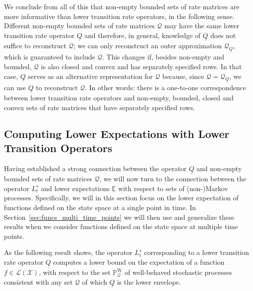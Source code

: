 \documentclass[10pt,a4paper]{paper}
\theoremstyle{definition}
\newcommand{\states}{\mathcal{X}}
\newcommand{\processes}{\mathbb{P}}
\newcommand{\wprocesses}{\processes^{\mathrm{W}}}
\newcommand{\gambles}{\mathcal{L}}
\newcommand{\gamblesX}{\gambles(\states)}
\newcommand{\rateset}{\mathcal{Q}}
\newcommand{\lrate}{\underline{Q}}
\begin{document}
We conclude from all of this that non-empty bounded sets of rate matrices are more informative than lower transition rate operators, in the following sense. Different non-empty bounded sets of rate matrices $\rateset$ may have the same lower transition rate operator $\lrate$ and therefore, in general, knowledge of $\lrate$ does not suffice to reconstruct $\rateset$; we can only reconstruct an outer approximation $\rateset_{\lrate}$, which is guaranteed to include $\rateset$. This changes if, besides non-empty and bounded, $\rateset$ is also closed and convex and has separately specified rows. In that case, $\lrate$ serves as an alternative representation for $\rateset$ because, since $\rateset=\rateset_{\lrate}$, we can use $\lrate$ to reconstruct $\rateset$. In other words: there is a one-to-one correspondence between lower transition rate operators and non-empty, bounded, closed and convex sets of rate matrices that have separately specified rows.




\subsection{Computing Lower Expectations with Lower Transition Operators}\label{sec:single_var_lower_exp}

Having established a strong connection between the operator $\lrate$ and non-empty bounded sets of rate matrices $\rateset$, we will now turn to the connection between the operator $L_t^s$ and lower expectations $\underline{\mathbb{E}}$ with respect to sets of (non-)Markov processes. Specifically, we will in this section focus on the lower expectation of functions defined on the state space at a single point in time. In Section~\ref{sec:funcs_multi_time_points} we will then use and generalize these results when we consider functions defined on the state space at multiple time points.

As the following result shows, the operator $L_t^s$ corresponding to a lower transition rate operator $\lrate$ computes a lower bound on the expectation of a function $f\in\gamblesX$, with respect to the set $\wprocesses_\rateset$ of well-behaved stochastic processes consistent with any set $\rateset$ of which $\lrate$ is the lower envelope.
\end{document}
